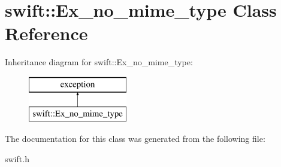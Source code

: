 \hypertarget{classswift_1_1_ex__no__mime__type}{\section{swift\-:\-:Ex\-\_\-no\-\_\-mime\-\_\-type Class Reference}
\label{classswift_1_1_ex__no__mime__type}
}
Inheritance diagram for swift\-:\-:Ex\-\_\-no\-\_\-mime\-\_\-type\-:\begin{figure}[H]
\begin{center}
\leavevmode
\includegraphics[height=2.000000cm]{classswift_1_1_ex__no__mime__type}
\end{center}
\end{figure}


The documentation for this class was generated from the following file\-:\begin{DoxyCompactItemize}
\item 
swift.\-h\end{DoxyCompactItemize}
